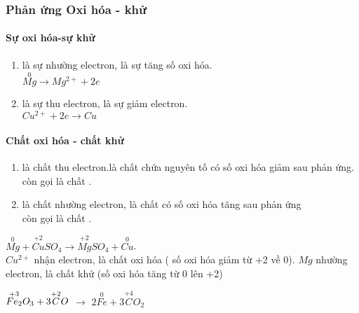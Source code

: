 \begin{body}
	\subsubsection{Phản ứng Oxi hóa - khử}
	\paragraph{Sự oxi hóa-sự khử}
	\begin{mylt}
		\begin{enumerate}[label = \indam{\alph*)}]
			\item {} là sự nhường electron, là sự tăng số oxi hóa.\\
			 $\overset{0}{Mg} \rightarrow Mg^{2+} + 2e$
			\item {} là sự thu electron, là sự giảm electron.\\
			 $Cu^{2+} +2e \rightarrow Cu $
		\end{enumerate}
	\end{mylt}
	\paragraph{Chất oxi hóa - chất khử}
	\begin{mylt}
		\begin{enumerate}[label = \indam{\alph*)}]
			\item {} là chất thu electron.là chất chứa nguyên tố có số oxi hóa giảm sau phản ứng.\\
			 còn gọi là chất \indam{bị khử}.
			\item {} là chất nhường electron, là chất có số oxi hóa tăng sau phản ứng\\
			 còn gọi là chất \indam{bị oxi hóa}.
		\end{enumerate}
	\end{mylt}
	\begin{vdnote}
		$ \overset{0}{Mg} + \overset{+2}{Cu}SO_{4} \rightarrow\overset{+2}{Mg}SO_{4}  + \overset{0}{Cu}$.\\
		$Cu^{2+}$ nhận electron, là chất oxi hóa ( số oxi hóa giảm từ +2 về 0).
		$Mg$ nhường electron, là chất khử (số oxi hóa tăng từ 0 lên +2)
	\end{vdnote}
	\begin{vdnote}
		$\overset{+3}{Fe_2}\overset{\vphantom{+3}}{O_3} + 3\overset{+2}{C}O$ $\longrightarrow$ $ 2 \overset{0}{Fe} + 3\overset{+4}{C}O_2$
	\end{vdnote}

\end{body}
